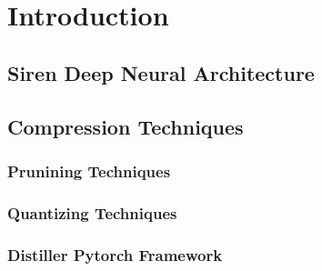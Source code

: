 
\section{Introduction}
    \subsection{Siren Deep Neural Architecture}
    
    



    \subsection{Compression Techniques}
    
    
    
    \subsubsection{Prunining Techniques}
    \subsubsection{Quantizing Techniques}
    \subsubsection{Distiller Pytorch Framework}
